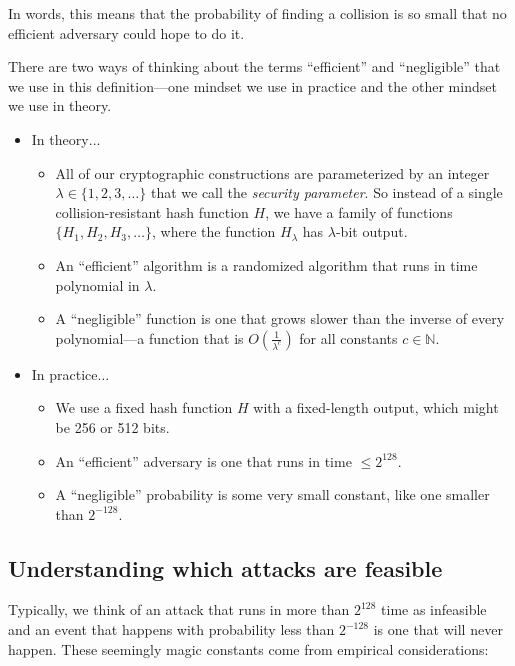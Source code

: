 \documentclass[
  letterpaper,
]{scrbook}
\providecommand{\tightlist}{%
  \setlength{\itemsep}{0pt}\setlength{\parskip}{0pt}}
\theoremstyle{definition}
\theoremstyle{plain}
\theoremstyle{plain}
\theoremstyle{remark}
\begin{document}
In words, this means that the probability of finding a collision is so
small that no efficient adversary could hope to do it.

There are two ways of thinking about the terms ``efficient'' and
``negligible'' that we use in this definition---one mindset we use in
practice and the other mindset we use in theory.

\begin{itemize}
\tightlist
\item
  In theory\(\ldots\)

  \begin{itemize}
  \tightlist
  \item
    All of our cryptographic constructions are parameterized by an
    integer \(\lambda \in \{1, 2, 3, \dots\}\) that we call the
    \emph{security parameter}. So instead of a single
    collision-resistant hash function \(H\), we have a family of
    functions \(\{ H_1, H_2, H_3, \dots \}\), where the function
    \(H_\lambda\) has \(\lambda\)-bit output.
  \item
    An ``efficient'' algorithm is a randomized algorithm that runs in
    time polynomial in \(\lambda\).
  \item
    A ``negligible'' function is one that grows slower than the inverse
    of every polynomial---a function that is \(O(\frac{1}{\lambda^c})\)
    for all constants \(c \in \mathbb{N}\).
  \end{itemize}
\item
  In practice\(\ldots\)

  \begin{itemize}
  \tightlist
  \item
    We use a fixed hash function \(H\) with a fixed-length output, which
    might be 256 or 512 bits.
  \item
    An ``efficient'' adversary is one that runs in time
    \(\leq 2^{128}\).
  \item
    A ``negligible'' probability is some very small constant, like one
    smaller than \(2^{-128}\).
  \end{itemize}
\end{itemize}

\subsection{Understanding which attacks are
feasible}\label{understanding-which-attacks-are-feasible}

Typically, we think of an attack that runs in more than \(2^{128}\) time
as infeasible and an event that happens with probability less than
\(2^{-128}\) is one that will never happen. These seemingly magic
constants come from empirical considerations:
\end{document}
